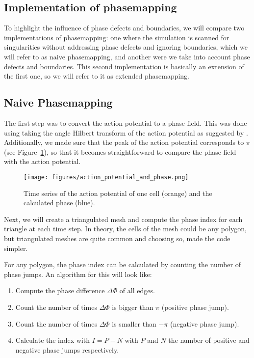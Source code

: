 \documentclass[twocolumn]{article}
\begin{document}
\subsection{Implementation of
phasemapping}\label{implementation-of-phasemapping}

To highlight the influence of phase defects and boundaries, we will
compare two implementations of phasemapping: one where the simulation is
scanned for singularities without addressing phase defects and ignoring
boundaries, which we will refer to as naive phasemapping, and another
were we take into account phase defects and boundaries. This second
implementation is basically an extension of the first one, so we will
refer to it as extended phasemapping.

\subsection{Naive Phasemapping}\label{naive-phasemapping}

The first step was to convert the action potential to a phase field.
This was done using taking the angle Hilbert transform of the action
potential as suggested by \autocite{bray2002considerations}. Additionally,
we made sure that the peak of the action potential corresponds to
\(\pi\) (see Figure~\ref{fig:action_potential_and_phase}),
so that it becomes straightforward to compare the phase field with
the action potential.

\begin{figure}[ht]
  \begin{center}
    \texttt{[image: figures/action\_potential\_and\_phase.png]}
  \end{center}
  \caption{
    Time series of the action potential of one cell (orange)
    and the calculated phase (blue).
  }\label{fig:action_potential_and_phase}
\end{figure}

Next, we will create a triangulated mesh and compute the phase index for
each triangle at each time step. In theory, the cells of the mesh could
be any polygon, but triangulated meshes are quite common and choosing
so, made the code simpler.

For any polygon, the phase index can be calculated by counting the
number of phase jumps. An algorithm for this will look like:

\begin{enumerate}
    \def\labelenumi{\arabic{enumi}.}
    \tightlist
  \item
    Compute the phase difference \(\Delta\Phi\) of all edges.
  \item
    Count the number of times \(\Delta\Phi\) is bigger than \(\pi\)
    (positive phase jump).
  \item
    Count the number of times \(\Delta\Phi\) is smaller than \(-\pi\)
    (negative phase jump).
  \item
    Calculate the index with \(I = P - N\) with \(P\) and \(N\) the number
    of positive and negative phase jumps respectively.
\end{enumerate}
\end{document}
